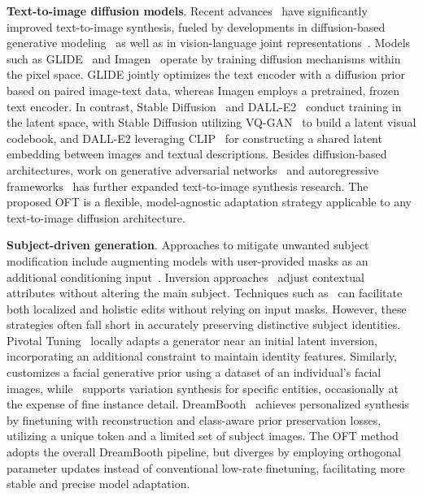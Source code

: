 \textbf{Text-to-image diffusion models}. Recent advances~\cite{saharia2022photorealistic,ramesh2022hierarchical,rombach2022high,gu2022vector,nichol2022glide} have significantly improved text-to-image synthesis, fueled by developments in diffusion-based generative modeling~\cite{ho2020denoising,song2021score,song2021denoising,dhariwal2021diffusion} as well as in vision-language joint representations~\cite{su2020vlbert,lu2019vilbert,radford2021learning,wang2021simvlm,li2022blip,li2023blip,alayrac2022flamingo,schuhmann2022laion}. Models such as GLIDE~\cite{nichol2022glide} and Imagen~\cite{saharia2022photorealistic} operate by training diffusion mechanisms within the pixel space. GLIDE jointly optimizes the text encoder with a diffusion prior based on paired image-text data, whereas Imagen employs a pretrained, frozen text encoder. In contrast, Stable Diffusion~\cite{rombach2022high} and DALL-E2~\cite{ramesh2022hierarchical} conduct training in the latent space, with Stable Diffusion utilizing VQ-GAN~\cite{esser2021taming} to build a latent visual codebook, and DALL-E2 leveraging CLIP~\cite{radford2021learning} for constructing a shared latent embedding between images and textual descriptions. Besides diffusion-based architectures, work on generative adversarial networks~\cite{reed2016generative,zhang2017stackgan,xu2018attngan,li2019controllable} and autoregressive frameworks~\cite{ramesh2021zero,ding2021cogview,wu2022nuwa,yuscaling} has further expanded text-to-image synthesis research. The proposed OFT is a flexible, model-agnostic adaptation strategy applicable to any text-to-image diffusion architecture.

\textbf{Subject-driven generation}. Approaches to mitigate unwanted subject modification include augmenting models with user-provided masks as an additional conditioning input~\cite{avrahami2022blended,nichol2022glide}. Inversion approaches~\cite{choi2021ilvr,dhariwal2021diffusion,ramesh2022hierarchical,gal2022image} adjust contextual attributes without altering the main subject. Techniques such as~\cite{hertz2022prompt} can facilitate both localized and holistic edits without relying on input masks. However, these strategies often fall short in accurately preserving distinctive subject identities. Pivotal Tuning~\cite{roich2022pivotal} locally adapts a generator near an initial latent inversion, incorporating an additional constraint to maintain identity features. Similarly,~\cite{nitzan2022mystyle} customizes a facial generative prior using a dataset of an individual's facial images, while~\cite{casanova2021instance} supports variation synthesis for specific entities, occasionally at the expense of fine instance detail. DreamBooth~\cite{ruiz2023dreambooth} achieves personalized synthesis by finetuning with reconstruction and class-aware prior preservation losses, utilizing a unique token and a limited set of subject images. The OFT method adopts the overall DreamBooth pipeline, but diverges by employing orthogonal parameter updates instead of conventional low-rate finetuning, facilitating more stable and precise model adaptation.


